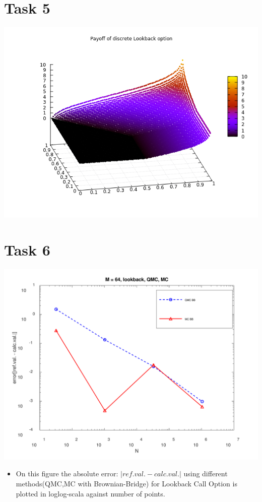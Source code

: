 \documentclass[10pt,a4paper]{article}
\begin{document}
\section*{Task 5}

\begin{center}
	\includegraphics[scale=0.55]{images/payoff_lookback.png}
\end{center}

\section*{Task 6}

\begin{center}
	\includegraphics[scale=0.3]{images/task6_error.png}
\end{center}
\begin{itemize}
    \item{
        On this figure the absolute error: $|ref.val.-calc.val.|$ using different methods(QMC,MC with Brownian-Bridge) for Lookback Call Option is plotted in loglog-scala against number of points.
        
    }
     
\end{itemize}
\end{document}
